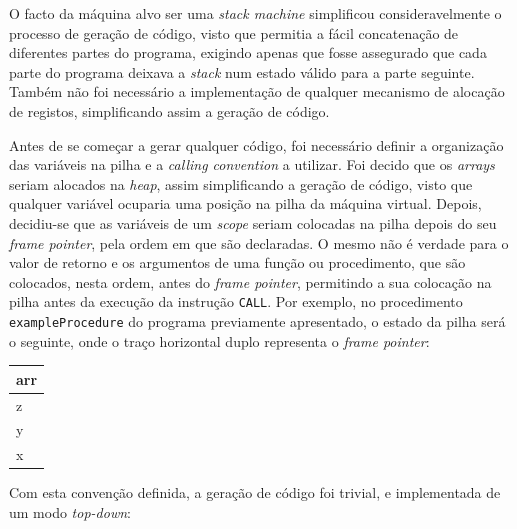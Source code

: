 \documentclass[12pt, a4paper]{article}
\begin{document}
O facto da máquina alvo ser uma \emph{stack machine} simplificou consideravelmente o processo de
geração de código, visto que permitia a fácil concatenação de diferentes partes do programa,
exigindo apenas que fosse assegurado que cada parte do programa deixava a \emph{stack} num estado
válido para a parte seguinte. Também não foi necessário a implementação de qualquer mecanismo de
alocação de registos, simplificando assim a geração de código.

Antes de se começar a gerar qualquer código, foi necessário definir a organização das variáveis na
pilha e a \emph{calling convention} a utilizar. Foi decido que os \emph{arrays} seriam alocados na
\emph{heap}, assim simplificando a geração de código, visto que qualquer variável ocuparia uma
posição na pilha da máquina virtual. Depois, decidiu-se que as variáveis de um \emph{scope} seriam
colocadas na pilha depois do seu \emph{frame pointer}, pela ordem em que são declaradas. O mesmo
não é verdade para o valor de retorno e os argumentos de uma função ou procedimento, que são
colocados, nesta ordem, antes do \emph{frame pointer}, permitindo a sua colocação na pilha antes da
execução da instrução \texttt{CALL}. Por exemplo, no procedimento \texttt{exampleProcedure} do
programa previamente apresentado, o estado da pilha será o seguinte, onde o traço horizontal duplo
representa o \emph{frame pointer}:

\begin{center}
    \begin{tabular}{|>{\centering\arraybackslash}p{}|}
        \hline arr \\
        \hline \hline z \\
        \hline y \\
        \hline x \\
        \hline
    \end{tabular}
\end{center}

Com esta convenção definida, a geração de código foi trivial, e implementada de um modo
\emph{top-down}:
\end{document}
